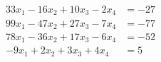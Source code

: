 \begin{align*}
33x_1  - 16x_2 + 10x_3 - 2x_4 &= -27 \\
99x_1 - 47x_2 + 27x_3 - 7x_4 &=  -77 \\
78x_1 - 36x_2 + 17x_3 - 6x_4 &=  -52 \\  
-9x_1 + 2x_2 + 3x_3 +4x_4 &=  5 
\end{align*}